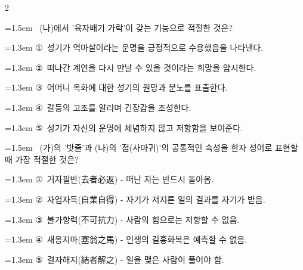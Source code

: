 \documentclass[10pt, a4paper]{article}
\begin{document}
\begin{multicols}{2}
\noindent\begin{minipage}{\columnwidth}
\vspace{2mm}
{\hangindent=1.5em  ~(나)에서 '육자배기 가락'이 갖는 기능으로 적절한 것은?\par}

\vspace{0.5mm}
{\hangindent=1.3em  \noindent\hspace{0.3em}①~성기가 역마살이라는 운명을 긍정적으로 수용했음을 나타낸다.\par}
{\hangindent=1.3em  \noindent\hspace{0.3em}②~떠나간 계연을 다시 만날 수 있을 것이라는 희망을 암시한다.\par}
{\hangindent=1.3em  \noindent\hspace{0.3em}③~어머니 옥화에 대한 성기의 원망과 분노를 표출한다.\par}
{\hangindent=1.3em  \noindent\hspace{0.3em}④~갈등의 고조를 알리며 긴장감을 조성한다.\par}
{\hangindent=1.3em  \noindent\hspace{0.3em}⑤~성기가 자신의 운명에 체념하지 않고 저항함을 보여준다.\par}
\vspace{4mm}
\end{minipage}
\par

\noindent\begin{minipage}{\columnwidth}
\vspace{2mm}
{\hangindent=1.5em  ~(가)의 '밧줄'과 (나)의 '점(사마귀)'의 공통적인 속성을 한자 성어로 표현할 때 가장 적절한 것은?\par}

\vspace{0.5mm}
{\hangindent=1.3em  \noindent\hspace{0.3em}①~거자필반(去者必返) - 떠난 자는 반드시 돌아옴.\par}
{\hangindent=1.3em  \noindent\hspace{0.3em}②~자업자득(自業自得) - 자기가 저지른 일의 결과를 자기가 받음.\par}
{\hangindent=1.3em  \noindent\hspace{0.3em}③~불가항력(不可抗力) - 사람의 힘으로는 저항할 수 없음.\par}
{\hangindent=1.3em  \noindent\hspace{0.3em}④~새옹지마(塞翁之馬) - 인생의 길흉화복은 예측할 수 없음.\par}
{\hangindent=1.3em  \noindent\hspace{0.3em}⑤~결자해지(結者解之) - 일을 맺은 사람이 풀어야 함.\par}
\vspace{4mm}
\end{minipage}
\par


\end{multicols}
\end{document}
